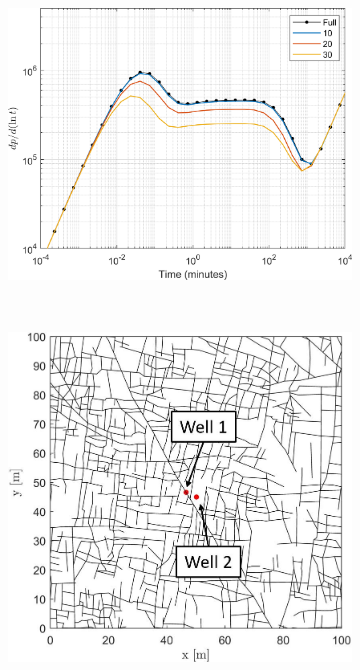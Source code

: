 \documentclass[Supplementary.tex]{subfiles}
\begin{document}
\begin{figure}[ht]
\begin{subfigure}{0.35\textwidth}
        \label{fig:Apodi2_DD_frac}
     \end{subfigure}
     \begin{subfigure}{0.35\textwidth}
        \includegraphics[width=\textwidth]{Apodi_DD/Apodi2_mat_nohead.png}
        \label{fig:Apodi2_DD_mat}
     \end{subfigure}
     \\
     \begin{subfigure}{0.285\textwidth}
        \includegraphics[width=\textwidth]{Apodi_DD/Apodi4.JPG}

\end{subfigure}
\end{figure}
\end{document}

